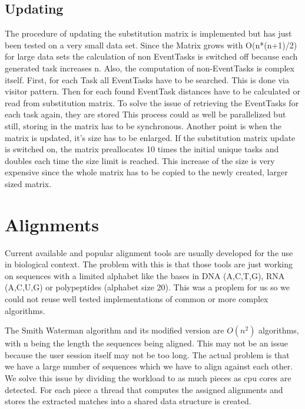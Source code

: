 \subsection{Updating}
	The procedure of updating the substitution matrix is implemented but has just been tested on a very small data set. 
	Since the Matrix grows with O(n*(n+1)/2) for large data sets the calculation of non EventTasks is switched off because each generated task increases n.
	Also, the computation of non-EventTasks is complex itself. 
	First, for each Task all EventTasks have to be searched. This is done via visitor pattern. 
	Then for each found EventTask distances have to be calculated or read from substitution matrix. 
	To solve the issue of retrieving the EventTasks for each task again, they are stored 
	This process could as well be parallelized but still, storing in the matrix has to be synchronous. 
	Another point is when the matrix is updated, it's size has to be enlarged. If the substitution matrix update is switched on, the matrix preallocates 10 times the initial unique tasks and doubles each time the size limit is reached.
	This increase of the size is very expensive since the whole matrix has to be copied to the newly created, larger sized matrix.

\section{Alignments}
Current available and popular alignment tools are usually developed for the use in biological context. 
The problem with this is that those tools are just working on sequences with a limited alphabet like the bases in DNA (A,C,T,G), RNA (A,C,U,G) or polypeptides (alphabet size 20).
This was a proplem for us so we could not reuse well tested implementations of common or more complex algorithms. 

The Smith Waterman algorithm and its modified version are $O(n^2)$ algorithms, with n being the length the sequences being aligned.
This may not be an issue because the user session itself may not be too long. 
The actual problem is that we have a large number of sequences which we have to align against each other. 
We solve this issue by dividing the workload to as much pieces as cpu cores are detected. 
For each piece a thread that computes the assigned alignments and stores the extracted matches into a shared data structure is created.


